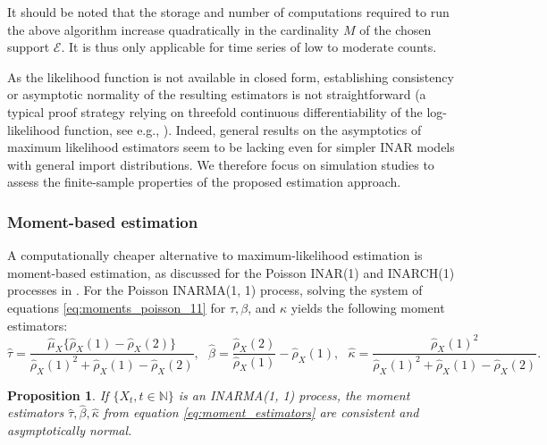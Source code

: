 \documentclass{article}
\newtheorem{proposition}{Proposition}
\begin{document}
It should be noted that the storage and number of computations required to run the above algorithm increase quadratically in the cardinality $M$ of the chosen support $\mathcal{E}$. It is thus only applicable for time series of low to moderate counts.

As the likelihood function is not available in closed form, establishing consistency or asymptotic normality of the resulting estimators is not straightforward (a typical proof strategy relying on threefold continuous differentiability of the log-likelihood function, see e.g., \cite{Fokianos2009}). Indeed, general results on the asymptotics of maximum likelihood estimators seem to be lacking even for simpler INAR models with general import distributions. We therefore focus on simulation studies to assess the finite-sample properties of the proposed estimation approach.

\subsubsection{Moment-based estimation}



A computationally cheaper alternative to maximum-likelihood estimation is moment-based estimation, as discussed for the Poisson INAR(1) and INARCH(1) processes in \cite{Weiss2016}. For the Poisson INARMA(1, 1) process, solving the system of equations \eqref{eq:moments_poisson_11}  for $\tau, \beta$, and $\kappa$ yields the following moment estimators:
\begin{equation}
\hat{\tau} = \frac{\hat{\mu}_X\{\hat{\rho}_X(1) - \hat{\rho}_X(2)\}}{\hat{\rho}_X(1)^2 + \hat{\rho}_X(1) - \hat{\rho}_X(2)}, \ \ \ \hat{\beta} = \frac{\hat{\rho}_X(2)}{\hat{\rho}_X(1)} - \hat{\rho}_X(1), \ \ \ \hat{\kappa} = \frac{\hat{\rho}_X(1)^2}{\hat{\rho}_X(1)^2 + \hat{\rho}_X(1) - \hat{\rho}_X(2)}.\label{eq:moment_estimators}
\end{equation}

\begin{proposition}
If $\{X_t, t \in \mathbb{N}\}$ is an INARMA(1, 1) process, the moment estimators $\hat{\tau}, \hat{\beta}, \hat{\kappa}$ from equation \eqref{eq:moment_estimators} are consistent and asymptotically normal.\label{proposition:moments}
\end{proposition}
\end{document}
